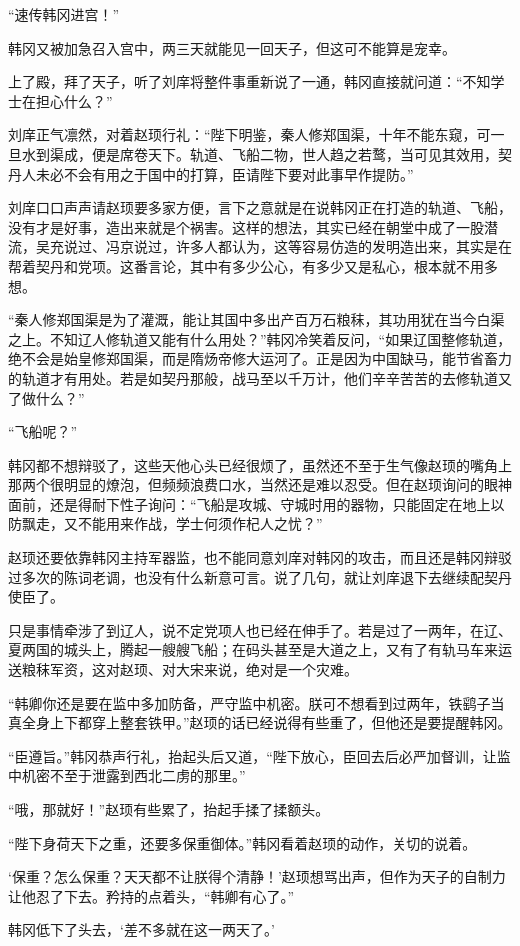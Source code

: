 “速传韩冈进宫！”

韩冈又被加急召入宫中，两三天就能见一回天子，但这可不能算是宠幸。

上了殿，拜了天子，听了刘庠将整件事重新说了一通，韩冈直接就问道：“不知学士在担心什么？”

刘庠正气凛然，对着赵顼行礼：“陛下明鉴，秦人修郑国渠，十年不能东窥，可一旦水到渠成，便是席卷天下。轨道、飞船二物，世人趋之若鹜，当可见其效用，契丹人未必不会有用之于国中的打算，臣请陛下要对此事早作提防。”

刘庠口口声声请赵顼要多家方便，言下之意就是在说韩冈正在打造的轨道、飞船，没有才是好事，造出来就是个祸害。这样的想法，其实已经在朝堂中成了一股潜流，吴充说过、冯京说过，许多人都认为，这等容易仿造的发明造出来，其实是在帮着契丹和党项。这番言论，其中有多少公心，有多少又是私心，根本就不用多想。

“秦人修郑国渠是为了灌溉，能让其国中多出产百万石粮秣，其功用犹在当今白渠之上。不知辽人修轨道又能有什么用处？”韩冈冷笑着反问，“如果辽国整修轨道，绝不会是始皇修郑国渠，而是隋炀帝修大运河了。正是因为中国缺马，能节省畜力的轨道才有用处。若是如契丹那般，战马至以千万计，他们辛辛苦苦的去修轨道又了做什么？”

“飞船呢？”

韩冈都不想辩驳了，这些天他心头已经很烦了，虽然还不至于生气像赵顼的嘴角上那两个很明显的燎泡，但频频浪费口水，当然还是难以忍受。但在赵顼询问的眼神面前，还是得耐下性子询问：“飞船是攻城、守城时用的器物，只能固定在地上以防飘走，又不能用来作战，学士何须作杞人之忧？”

赵顼还要依靠韩冈主持军器监，也不能同意刘庠对韩冈的攻击，而且还是韩冈辩驳过多次的陈词老调，也没有什么新意可言。说了几句，就让刘庠退下去继续配契丹使臣了。

只是事情牵涉了到辽人，说不定党项人也已经在伸手了。若是过了一两年，在辽、夏两国的城头上，腾起一艘艘飞船；在码头甚至是大道之上，又有了有轨马车来运送粮秣军资，这对赵顼、对大宋来说，绝对是一个灾难。

“韩卿你还是要在监中多加防备，严守监中机密。朕可不想看到过两年，铁鹞子当真全身上下都穿上整套铁甲。”赵顼的话已经说得有些重了，但他还是要提醒韩冈。

“臣遵旨。”韩冈恭声行礼，抬起头后又道，“陛下放心，臣回去后必严加督训，让监中机密不至于泄露到西北二虏的那里。”

“哦，那就好！”赵顼有些累了，抬起手揉了揉额头。

“陛下身荷天下之重，还要多保重御体。”韩冈看着赵顼的动作，关切的说着。

‘保重？怎么保重？天天都不让朕得个清静！’赵顼想骂出声，但作为天子的自制力让他忍了下去。矜持的点着头，“韩卿有心了。”

韩冈低下了头去，‘差不多就在这一两天了。’

